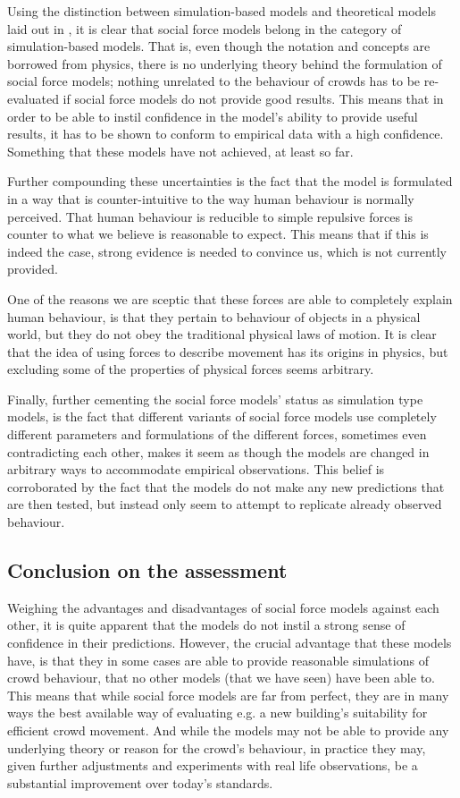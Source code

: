Using the distinction between simulation-based models and theoretical models 
laid out in \cite{imfufa-tekst}, it is clear that social force models belong 
in the category of simulation-based models. That is, even though the notation 
and concepts are borrowed from physics, there is no underlying theory behind 
the formulation of social force models; nothing unrelated to the behaviour of 
crowds has to be re-evaluated if social force models do not provide good 
results. This means that in order to be able to instil confidence in the 
model's ability to provide useful results, it has to be shown to conform to 
empirical data with a high confidence. Something that these models have not 
achieved, at least so far.

Further compounding these uncertainties is the fact that the model is 
formulated in a way that is counter-intuitive to the way human behaviour is 
normally perceived. That human behaviour is reducible to simple repulsive 
forces is counter to what we believe is reasonable to expect. This means that 
if this is indeed the case, strong evidence is needed to convince us, which is 
not currently provided.

One of the reasons we are sceptic that these forces are able to completely 
explain human behaviour, is that they pertain to behaviour of objects in a 
physical world, but they do not obey the traditional physical laws of motion.  
It is clear that the idea of using forces to describe movement has its origins 
in physics, but excluding some of the properties of physical forces seems 
arbitrary.

Finally, further cementing the social force models' status as simulation type 
models, is the fact that different variants of social force models use 
completely different parameters and formulations of the different forces, 
sometimes even contradicting each other, makes it seem as though the models 
are changed in arbitrary ways to accommodate empirical observations. This 
belief is corroborated by the fact that the models do not make any new 
predictions that are then tested, but instead only seem to attempt to 
replicate already observed behaviour.

\subsection{Conclusion on the assessment}
Weighing the advantages and disadvantages of social force models against each 
other, it is quite apparent that the models do not instil a strong sense of 
confidence in their predictions. However, the crucial advantage that these 
models have, is that they in some cases are able to provide reasonable 
simulations of crowd behaviour, that no other models (that we have seen) have 
been able to. This means that while social force models are far from perfect, 
they are in many ways the best available way of evaluating e.g. a new 
building's suitability for efficient crowd movement. And while the models may 
not be able to provide any underlying theory or reason for the crowd's 
behaviour, in practice they may, given further adjustments and experiments 
with real life observations, be a substantial improvement over today's 
standards.
